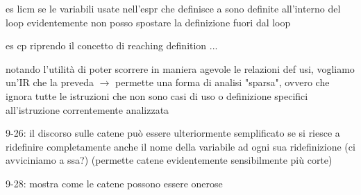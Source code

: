 es licm se le variabili usate nell'espr che definisce a sono definite all'interno del loop evidentemente non posso spostare la definizione fuori dal loop

es cp riprendo il concetto di reaching definition ...

notando l'utilit\`a di poter scorrere in maniera agevole le relazioni def usi, vogliamo un'IR che la preveda $\rightarrow$ permette una forma di analisi "sparsa", ovvero che ignora tutte le istruzioni che non sono casi di uso o definizione specifici all'istruzione correntemente analizzata

9-26: il discorso sulle catene pu\`o essere ulteriormente semplificato se si riesce a ridefinire completamente anche il nome della variabile ad ogni sua ridefinizione (ci avviciniamo a ssa?) (permette catene evidentemente sensibilmente pi\`u corte)

9-28: mostra come le catene possono essere onerose


